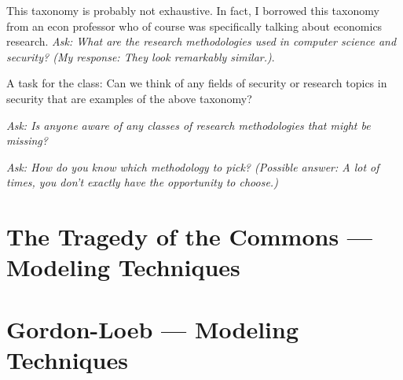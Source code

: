 \documentclass[11pt]{article}
\begin{document}
This taxonomy is probably not exhaustive. In fact, I borrowed this taxonomy from an econ professor who of course was specifically talking about economics research. {\it Ask: What are the research methodologies used in computer science and security? (My response: They look remarkably similar.)}.

A task for the class: Can we think of any fields of security or research topics in security that are examples of the above taxonomy?




{\it Ask: Is anyone aware of any classes of research methodologies that might be missing? }

{\it Ask: How do you know which methodology to pick? (Possible answer: A lot of times, you don't exactly have the opportunity to choose.)}




\section{The Tragedy of the Commons --- Modeling Techniques}

\section{Gordon-Loeb --- Modeling Techniques}
\end{document}
